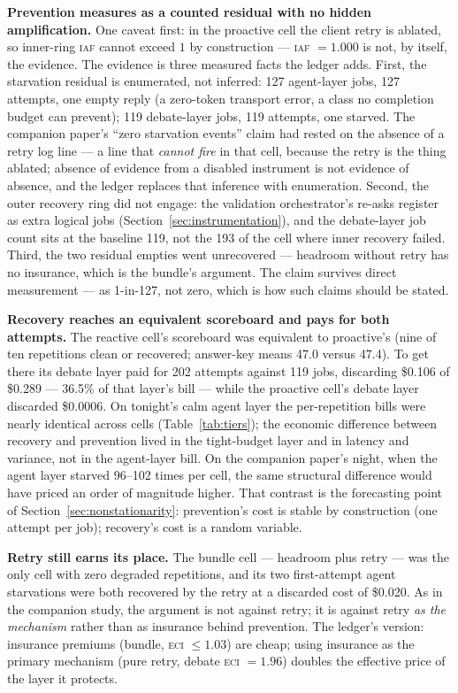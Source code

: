 \documentclass[11pt]{article}
\newcommand{\iaf}{\textsc{iaf}}
\newcommand{\eci}{\textsc{eci}}
\begin{document}
\textbf{Prevention measures as a counted residual with no hidden
amplification.} One caveat first: in the proactive cell the client
retry is ablated, so inner-ring \iaf{} cannot exceed $1$ by
construction --- \iaf{} $=1.000$ is not, by itself, the evidence. The
evidence is three measured facts the ledger adds. First, the
starvation residual is enumerated, not inferred: 127 agent-layer jobs,
127 attempts, one empty reply (a zero-token transport error, a class
no completion budget can prevent); 119 debate-layer jobs, 119
attempts, one starved. The companion paper's ``zero starvation
events'' claim had rested on the absence of a retry log line --- a
line that \emph{cannot fire} in that cell, because the retry is the
thing ablated; absence of evidence from a disabled instrument is not
evidence of absence, and the ledger replaces that inference with
enumeration. Second, the outer recovery ring did not engage: the
validation orchestrator's re-asks register as extra logical jobs
(Section~\ref{sec:instrumentation}), and the debate-layer job count
sits at the baseline 119, not the 193 of the cell where inner
recovery failed. Third, the two residual empties went unrecovered ---
headroom without retry has no insurance, which is the bundle's
argument. The claim survives direct measurement --- as 1-in-127, not
zero, which is how such claims should be stated.

\textbf{Recovery reaches an equivalent scoreboard and pays for both
attempts.} The reactive cell's scoreboard was equivalent to
proactive's (nine of ten repetitions clean or recovered; answer-key
means 47.0 versus 47.4). To
get there its debate layer paid for 202 attempts against 119 jobs,
discarding \$0.106 of \$0.289 --- 36.5\% of that layer's bill --- while
the proactive cell's debate layer discarded \$0.0006. On tonight's calm
agent layer the per-repetition bills were nearly identical across
cells (Table~\ref{tab:tiers}); the economic difference between
recovery and prevention lived in the tight-budget layer and in
latency and variance, not in the agent-layer bill. On the companion
paper's night, when the agent layer starved 96--102 times per cell,
the same structural difference would have priced an order of magnitude
higher. That contrast is the forecasting point of
Section~\ref{sec:nonstationarity}: prevention's cost is stable by
construction (one attempt per job); recovery's cost is a random
variable.

\textbf{Retry still earns its place.} The bundle cell --- headroom plus
retry --- was the only cell with zero degraded repetitions, and its two
first-attempt agent starvations were both recovered by the retry at a
discarded cost of \$0.020. As in the companion study, the argument is not against retry;
it is against retry \emph{as the mechanism} rather than as insurance
behind prevention. The ledger's version: insurance premiums (bundle,
\eci{} $\leq 1.03$) are cheap; using insurance as the primary mechanism
(pure retry, debate \eci{} $=1.96$) doubles the effective price of the
layer it protects.
\end{document}
